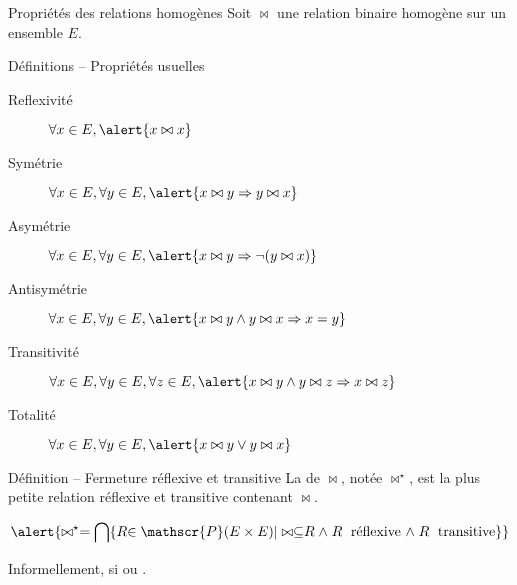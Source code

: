 
\begingroup


\begin{frame}{Propriétés des relations homogènes}
  Soit $\bowtie$ une relation binaire homogène sur un ensemble $E$.
  \begin{block}{Définitions -- Propriétés usuelles}
    \vspace{-1mm}
    \begin{description}
    \item[Reflexivité]  $\forall x\in E, \alert{x\bowtie x}$
    \item[Symétrie]     $\forall x\in E, \forall y\in E, \alert{x \bowtie y \Rightarrow y \bowtie x}$
    \item[Asymétrie]    $\forall x\in E, \forall y\in E, \alert{x \bowtie y \Rightarrow \lnot(y \bowtie x)}$
    \item[Antisymétrie] $\forall x\in E, \forall y\in E, \alert{x \bowtie y \land y \bowtie x \Rightarrow x=y}$
    \item[Transitivité] $\forall x\in E, \forall y\in E, \forall z\in E, \alert{x \bowtie y \land y \bowtie z \Rightarrow x \bowtie z}$
    \item[Totalité]     $\forall x\in E, \forall y\in E, \alert{x \bowtie y \lor y \bowtie x}$
    \end{description}
  \end{block}

  \vspace{-1mm}
  \begin{block}{Définition -- Fermeture réflexive et transitive}
    La  de $\bowtie$, notée $\bowtie^\star$, est la plus petite relation réflexive et transitive contenant $\bowtie$. 

    \vspace{-2mm}
    $$\alert{\bowtie^\star = \bigcap \{ \mathrel{R} \in\mathscr{P}(E\times E) | \bowtie \subseteq \mathrel{R} \land \mathrel{R} \text{ réflexive } \land \mathrel{R} \text{ transitive}\}}$$

    Informellement,  si  ou .
  \end{block}
\end{frame}

\endgroup
